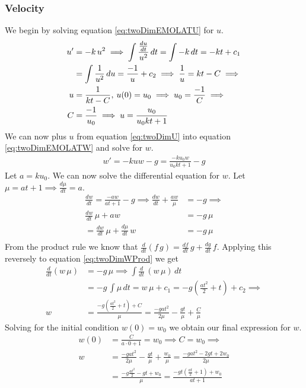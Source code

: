 \documentclass[%
aip,
jmp,
amsmath,amssymb,
reprint,%
]{revtex4-1}
\newcommand{\comma}{\hspace{0.1mm},\hspace{0.7mm}}
\begin{document}
	\subsubsection{Velocity}
	We begin by solving equation \eqref{eq:twoDimEMOLATU} for $u$.
	\begin{align}\nonumber
	u' &= -k\,u^2 \implies \int \frac{\frac{du}{dt}}{u^2}\,dt = \int -k\,dt = -kt + 
	c_1\\\nonumber
	&= \int \frac{1}{u^2}\,du = \frac{-1}{u} +c_2 \implies \frac{1}{u} = kt - C \implies \\\nonumber
	u &= \frac{1}{kt-C} \comma u(0) = u_0 \implies u_0 = \frac{-1}{C} \implies\\\label{eq:twoDimU}
	C &= \frac{-1}{u_0} \implies u = \frac{u_0}{u_0kt+1}
	\end{align}
	We can now plus $u$ from equation \eqref{eq:twoDimU} into equation \eqref{eq:twoDimEMOLATW} and solve for $w$.
	\begin{align}\nonumber
		w' = -kuw-g = \frac{-ku_0w}{u_0kt+1}-g
	\end{align}
	Let $a = ku_0$. We can now solve the differential equation for $w$. Let $\mu = at+1 \implies \frac{d\mu}{dt} = a$.
	\begin{align}\nonumber
		\frac{dw}{dt} = \frac{-aw}{at+1}-g \implies \frac{dw}{dt} + \frac{aw}{\mu} &= -g \implies\\\nonumber
		\frac{dw}{dt}\,\mu + aw &= -g\,\mu \\\label{eq:twoDimWProd}
		=\frac{dw}{dt}\,\mu + \frac{d\mu}{dt}\,w &= -g\,\mu\\\nonumber
	\end{align}
	From the product rule we know that $\frac{d}{dt}(f\,g) = \frac{df}{dt}\,g+\frac{dg}{dt}\,f$. Applying this reversely to equation \eqref{eq:twoDimWProd} we get
	\begin{align}\nonumber
		\frac{d}{dt}(w\,\mu) &= -g\,\mu\implies\int\frac{d}{dt}\,(w\,\mu)\,dt\\\nonumber
		&= -g\,\int \mu\,dt = w\,\mu+c_1 = -g(\frac{at^2}{2}+t)+c_2\implies\\\nonumber
		w &= \frac{-g(\frac{at^2}{2}+t)+C}{\mu} = \frac{-gat^2}{2\mu}-\frac{gt}{\mu}+\frac{C}{\mu}
	\end{align}
	Solving for the initial condition $w(0) = w_0$ we obtain our final expression for $w$.
	\begin{align}\nonumber
		w(0) &= \frac{C}{a\cdot 0+1} = w_0 \implies C = w_0 \implies\\\nonumber
		w &= \frac{-gat^2}{2\mu}-\frac{gt}{\mu}+\frac{w_0}{\mu} = \frac{-gat^2-2gt+2w_0}{2\mu}\\\nonumber
		&= \frac{-g\frac{at^2}{2}-gt+w_0}{\mu} = \frac{-gt(\frac{at}{2}+1)+w_0}{at+1}
	\end{align}
\end{document}
